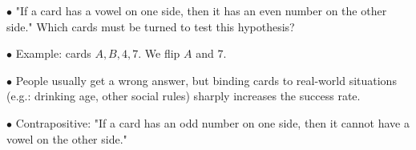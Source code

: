 \documentclass[english,openany]{book}
\begin{document}
$\bullet$ "If a card has a vowel on one side, then it has an even number on the other side." Which cards must be turned to test this hypothesis?

$\bullet$ Example: cards $A, B, 4, 7$. We flip $A$ and $7$.

$\bullet$ People usually get a wrong answer, but binding cards to real-world situations (e.g.: drinking age, other social rules) sharply increases the success rate.

$\bullet$ Contrapositive: "If a card has an odd number on one side, then it cannot have a vowel on the other side."
\end{document}

